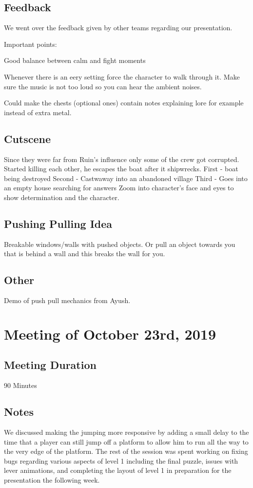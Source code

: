 \documentclass{article}
\begin{document}
\subsection{Feedback}
We went over the feedback given by other teams regarding our presentation.

Important points:
\begin{description}
\item Good balance between calm and fight moments
\item Whenever there is an eery setting force the character to walk through it. Make sure the music is not too loud so you can hear the ambient noises.
\item Could make the chests (optional ones) contain notes explaining lore for example instead of extra metal.
\end{description}

\subsection{Cutscene}
Since they were far from Ruin's influence only some of the crew got corrupted. Started killing each other, he escapes the boat after it shipwrecks. 
First - boat being destroyed
Second - Castwaway into an abandoned village
Third - Goes into an empty house searching for answers
Zoom into character's face and eyes to show determination and the character.

\subsection{Pushing Pulling Idea}
Breakable windows/walls with pushed objects. Or pull an object towards you that is behind a wall and this breaks the wall for you.

\subsection{Other}
Demo of push pull mechanics from Ayush.

\section{Meeting of October 23rd, 2019}

\subsection{Meeting Duration}
90 Minutes

\subsection{Notes}
We discussed making the jumping more responsive by adding a small delay to the time that a player can still jump off a platform to allow him to run all the way to the very edge of the platform. The rest of the session was spent working on fixing bugs regarding various aspects of level 1 including the final puzzle, issues with lever animations, and completing the layout of level 1 in preparation for the presentation the following week.
\end{document}

